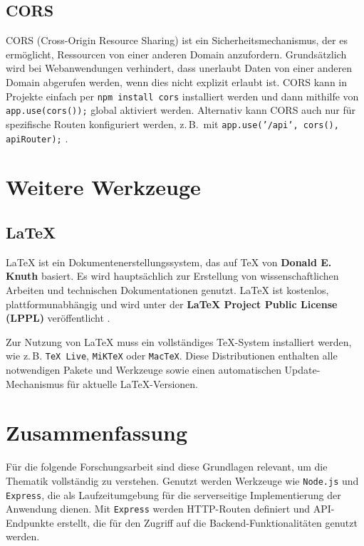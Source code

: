 \documentclass[oneside]{ausarbeitung}
\begin{document}
\subsection{CORS}

CORS (Cross-Origin Resource Sharing) ist ein Sicherheitsmechanismus, der es ermöglicht, Ressourcen von einer anderen Domain anzufordern. Grundsätzlich wird bei Webanwendungen verhindert, dass unerlaubt Daten von einer anderen Domain abgerufen werden, wenn dies nicht explizit erlaubt ist. CORS kann in Projekte einfach per \texttt{npm install cors} installiert werden und dann mithilfe von \texttt{app.use(cors());} global aktiviert werden. Alternativ kann CORS auch nur für spezifische Routen konfiguriert werden, z.\,B.\ mit \texttt{app.use('/api', cors(), apiRouter);} \parencite{cors-npm}.

\section{Weitere Werkzeuge}

\subsection{LaTeX}

\LaTeX{} ist ein Dokumentenerstellungssystem, das auf \TeX{} von \textbf{Donald E. Knuth} basiert. Es wird hauptsächlich zur Erstellung von wissenschaftlichen Arbeiten und technischen Dokumentationen genutzt. \LaTeX{} ist kostenlos, plattformunabhängig und wird unter der \textbf{LaTeX Project Public License (LPPL)} veröffentlicht \parencite{latex-project}.  

Zur Nutzung von \LaTeX{} muss ein vollständiges \TeX-System installiert werden, wie z.\,B. \texttt{TeX Live}, \texttt{MiKTeX} oder \texttt{MacTeX}. Diese Distributionen enthalten alle notwendigen Pakete und Werkzeuge sowie einen automatischen Update-Mechanismus für aktuelle \LaTeX-Versionen.  

\section{Zusammenfassung}

Für die folgende Forschungsarbeit sind diese Grundlagen relevant, um die Thematik vollständig zu verstehen. Genutzt werden Werkzeuge wie \texttt{Node.js} und \texttt{Express}, die als Laufzeitumgebung für die serverseitige Implementierung der Anwendung dienen. Mit \texttt{Express} werden HTTP-Routen definiert und API-Endpunkte erstellt, die für den Zugriff auf die Backend-Funktionalitäten genutzt werden.  
\end{document}
